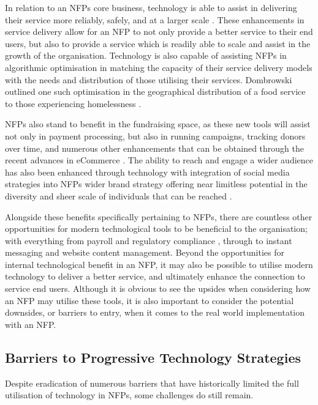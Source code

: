 In relation to an NFPs core business, technology is able to assist in delivering their service more reliably, safely, and at a larger scale \cite{boles2013technology}. These enhancements in service delivery allow for an NFP to not only provide a better service to their end users, but also to provide a service which is readily able to scale and assist in the growth of the organisation. Technology is also capable of assisting NFPs in algorithmic optimisation in matching the capacity of their service delivery models with the needs and distribution of those utilising their services. Dombrowski outlined one such optimisation in the geographical distribution of a food service to those experiencing homelessness \cite{dombrowski2013takes}.

NFPs also stand to benefit in the fundraising space, as these new tools will assist not only in payment processing, but also in running campaigns, tracking donors over time, and numerous other enhancements that can be obtained through the recent advances in eCommerce \cite{goecks2008charitable} \cite{boeder2002non}. The ability to reach and engage a wider audience has also been enhanced through technology with integration of social media strategies into NFPs wider brand strategy offering near limitless potential in the diversity and sheer scale of individuals that can be reached \cite{lovejoy2012information} \cite{nah2013modeling} \cite{wyllie2016examination} \cite{milde2017strategies}.

Alongside these benefits specifically pertaining to NFPs, there are countless other opportunities for modern technological tools to be beneficial to the organisation; with everything from payroll and regulatory compliance \cite{mahajan2015review}, through to instant messaging and website content management. Beyond the opportunities for internal technological benefit in an NFP, it may also be possible to utilise modern technology to deliver a better service, and ultimately enhance the connection to service end users. Although it is obvious to see the upsides when considering how an NFP may utilise these tools, it is also important to consider the potential downsides, or barriers to entry, when it comes to the real world implementation with an NFP.

\subsection{Barriers to Progressive Technology Strategies}

Despite eradication of numerous barriers that have historically limited the full utilisation of technology in NFPs, some challenges do still remain. 

